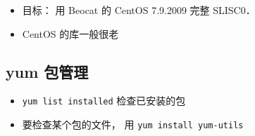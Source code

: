 
\begin{issues}
\issueDraft
\end{issues}

\begin{itemize}
\item 目标： 用 Beocat 的 CentOS 7.9.2009 完整 SLISC0．
\item CentOS 的库一般很老
\end{itemize}

\subsection{yum 包管理}
\begin{itemize}
\item \verb|yum list installed| 检查已安装的包
\item 要检查某个包的文件， 用 \verb|yum install yum-utils|
\end{itemize}
